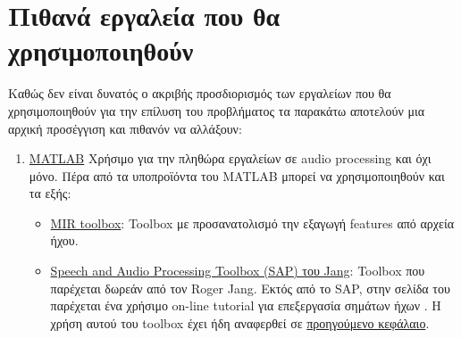 \section{Πιθανά εργαλεία που θα χρησιμοποιηθούν}
Καθώς δεν είναι δυνατός ο ακριβής προσδιορισμός των εργαλείων που θα χρησιμοποιηθούν για την επίλυση του προβλήματος τα παρακάτω αποτελούν μια αρχική προσέγγιση και πιθανόν να αλλάξουν:
\begin{enumerate}
    \item \href{https://www.mathworks.com/products/matlab/}{MATLAB}
    Χρήσιμο για την πληθώρα εργαλείων σε audio processing και όχι μόνο.
    Πέρα από τα υποπροϊόντα του MATLAB μπορεί να χρησιμοποιηθούν και τα εξής:
    \begin{itemize}
        \item \href{https://www.jyu.fi/hum/laitokset/musiikki/en/research/coe/materials/mirtoolbox}{MIR toolbox}:
        Toolbox με προσανατολισμό την εξαγωγή features από αρχεία ήχου.
        \item \href{http://mirlab.org/jang/matlab/toolbox/sap/}{Speech and Audio Processing Toolbox (SAP) του Jang}:
        Toolbox που παρέχεται δωρεάν από τον Roger Jang.
        Εκτός από το SAP, στην σελίδα του παρέχεται ένα χρήσιμο on-line tutorial για επεξεργασία σημάτων ήχων \cite{jang2011audio}.
        Η χρήση αυτού του toolbox έχει ήδη αναφερθεί σε \hyperref[pve:SAP]{προηγούμενο κεφάλαιο}.
    \end{itemize}


\end{enumerate}
